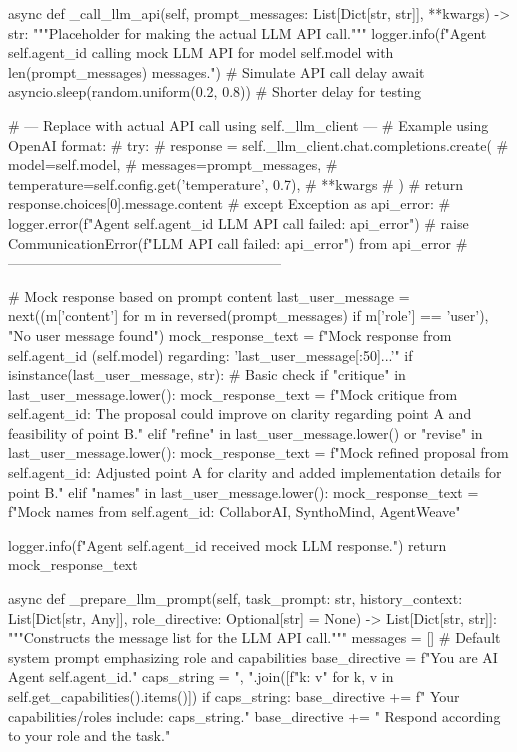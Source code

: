 \documentclass{amsbook}
\theoremstyle{definition}
\theoremstyle{remark}
\numberwithin{equation}{chapter} %
\begin{document}
\begin{python}
    async def _call_llm_api(self, prompt_messages: List[Dict[str, str]], **kwargs) -> str:
        """Placeholder for making the actual LLM API call."""
        logger.info(f"Agent {self.agent_id} calling mock LLM API for model {self.model} with {len(prompt_messages)} messages.")
        # Simulate API call delay
        await asyncio.sleep(random.uniform(0.2, 0.8)) # Shorter delay for testing

        # --- Replace with actual API call using self._llm_client ---
        # Example using OpenAI format:
        # try:
        #     response = self._llm_client.chat.completions.create(
        #         model=self.model,
        #         messages=prompt_messages,
        #         temperature=self.config.get('temperature', 0.7),
        #         **kwargs
        #     )
        #     return response.choices[0].message.content
        # except Exception as api_error:
        #     logger.error(f"Agent {self.agent_id} LLM API call failed: {api_error}")
        #     raise CommunicationError(f"LLM API call failed: {api_error}") from api_error
        # -----------------------------------------------------------

        # Mock response based on prompt content
        last_user_message = next((m['content'] for m in reversed(prompt_messages) if m['role'] == 'user'), "No user message found")
        mock_response_text = f"Mock response from {self.agent_id} ({self.model}) regarding: '{last_user_message[:50]}...'"
        if isinstance(last_user_message, str): # Basic check
            if "critique" in last_user_message.lower():
                 mock_response_text = f"Mock critique from {self.agent_id}: The proposal could improve on clarity regarding point A and feasibility of point B."
            elif "refine" in last_user_message.lower() or "revise" in last_user_message.lower():
                mock_response_text = f"Mock refined proposal from {self.agent_id}: Adjusted point A for clarity and added implementation details for point B."
            elif "names" in last_user_message.lower():
                 mock_response_text = f"Mock names from {self.agent_id}: CollaborAI, SynthoMind, AgentWeave"

        logger.info(f"Agent {self.agent_id} received mock LLM response.")
        return mock_response_text

    async def _prepare_llm_prompt(self, task_prompt: str, history_context: List[Dict[str, Any]], role_directive: Optional[str] = None) -> List[Dict[str, str]]:
        """Constructs the message list for the LLM API call."""
        messages = []
        # Default system prompt emphasizing role and capabilities
        base_directive = f"You are AI Agent {self.agent_id}."
        caps_string = ", ".join([f"{k}: {v}" for k, v in self.get_capabilities().items()])
        if caps_string:
            base_directive += f" Your capabilities/roles include: {caps_string}."
        base_directive += " Respond according to your role and the task."


\end{python}
\end{document}
